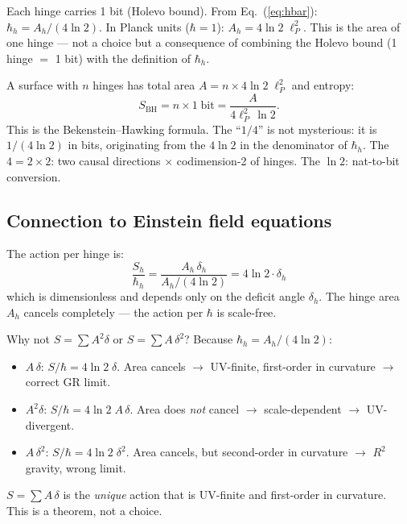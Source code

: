 Each hinge carries 1 bit (Holevo bound). From Eq.~(\ref{eq:hbar}): $\hbar_h = A_h/(4\ln 2)$. In Planck units ($\hbar = 1$): $A_h = 4\ln 2\;\ell_P^2$. This is the area of one hinge --- not a choice but a consequence of combining the Holevo bound (1 hinge $=$ 1 bit) with the definition of $\hbar_h$.

A surface with $n$ hinges has total area $A = n \times 4\ln 2\;\ell_P^2$ and entropy:
\begin{equation}
S_\text{BH} = n \times 1\;\text{bit} = \frac{A}{4\ell_P^2\,\ln 2}.
\end{equation}
This is the Bekenstein--Hawking formula. The ``$1/4$'' is not mysterious: it is $1/(4\ln 2)$ in bits, originating from the $4\ln 2$ in the denominator of $\hbar_h$. The $4 = 2 \times 2$: two causal directions $\times$ codimension-2 of hinges. The $\ln 2$: nat-to-bit conversion.

\subsection{Connection to Einstein field equations}

The action per hinge is:
\begin{equation}
\frac{S_h}{\hbar_h} = \frac{A_h\,\delta_h}{A_h/(4\ln 2)} = 4\ln 2 \cdot \delta_h
\end{equation}
which is dimensionless and depends only on the deficit angle $\delta_h$. The hinge area $A_h$ cancels completely --- the action per $\hbar$ is scale-free.

\begin{remark}[Uniqueness of $S = \sum A\,\delta$]
Why not $S = \sum A^2\delta$ or $S = \sum A\,\delta^2$? Because $\hbar_h = A_h/(4\ln 2)$:
\begin{itemize}
\item $A\,\delta$: $S/\hbar = 4\ln 2\;\delta$. Area cancels $\to$ UV-finite, first-order in curvature $\to$ correct GR limit. \checkmark
\item $A^2\delta$: $S/\hbar = 4\ln 2\;A\,\delta$. Area does \emph{not} cancel $\to$ scale-dependent $\to$ UV-divergent. 
\item $A\,\delta^2$: $S/\hbar = 4\ln 2\;\delta^2$. Area cancels, but second-order in curvature $\to$ $R^2$ gravity, wrong limit. 
\end{itemize}
$S = \sum A\,\delta$ is the \emph{unique} action that is UV-finite and first-order in curvature. This is a theorem, not a choice.
\end{remark}

